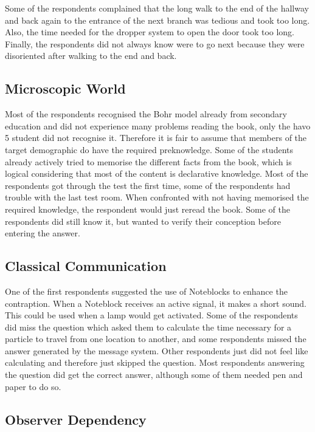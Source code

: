 \documentclass[11pt,twoside]{report} %
\begin{document}
Some of the respondents complained that the long walk to the end of the hallway and back again to the entrance of the next branch was tedious and took too long. Also, the time needed for the dropper system to open the door took too long. Finally, the respondents did not always know were to go next because they were disoriented after walking to the end and back. 

\subsection{Microscopic World}

Most of the respondents recognised the Bohr model already from secondary education and did not experience many problems reading the book, only the havo 5 student did not recognise it. Therefore it is fair to assume that members of the target demographic do have the required preknowledge. Some of the students already actively tried to memorise the different facts from the book, which is logical considering that most of the content is declarative knowledge. Most of the respondents got through the test the first time, some of the respondents had trouble with the last test room. When confronted with not having memorised the required knowledge, the respondent would just reread the book. Some of the respondents did still know it, but wanted to verify their conception before entering the answer.

\subsection{Classical Communication}

One of the first respondents suggested the use of Noteblocks to enhance the contraption. When a Noteblock receives an active signal, it makes a short sound. This could be used when a lamp would get activated. Some of the respondents did miss the question which asked them to calculate the time necessary for a particle to travel from one location to another, and some respondents missed the answer generated by the message system. Other respondents just did not feel like calculating and therefore just skipped the question. Most respondents answering the question did get the correct answer, although some of them needed pen and paper to do so.

\subsection{Observer Dependency}
\end{document}
